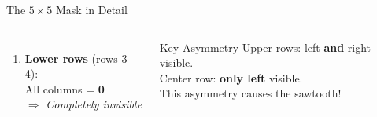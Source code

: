 \documentclass[aspectratio=169, 11pt]{beamer}
\begin{document}
\begin{frame}{The $5 \times 5$ Mask in Detail}
\begin{columns}[c]
\begin{enumerate}
    \vspace{0.2cm}
    \item \textcolor{cgray}{\textbf{Lower rows}} (rows 3--4): \\
    All columns = \textbf{0} \\
    $\Rightarrow$ \emph{Completely invisible}
\end{enumerate}

\vspace{0.3cm}
\begin{alertblock}{Key Asymmetry}
Upper rows: left \textbf{and} right visible.\\
Center row: \textbf{only left} visible.\\
This asymmetry causes the sawtooth!
\end{alertblock}
\end{columns}
\end{frame}
\end{document}
